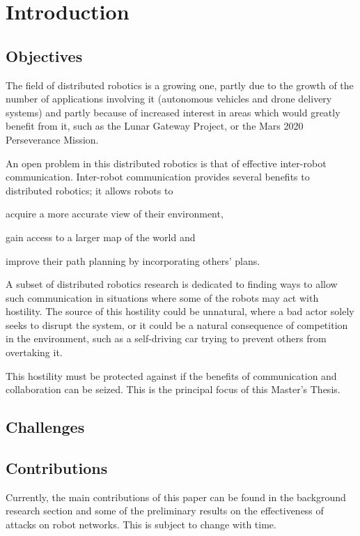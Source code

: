 \chapter{Introduction}
\section{Objectives}

The field of distributed robotics is a growing one, partly due to the growth of the number of applications involving it (autonomous vehicles and drone delivery systems) and partly because of increased interest in areas which would greatly benefit from it, such as the Lunar Gateway Project, or the Mars 2020 Perseverance Mission.

An open problem in this distributed robotics is that of effective inter-robot communication. Inter-robot communication provides several benefits to distributed robotics; it allows robots to
\begin{enumerate*}
    \item acquire a more accurate view of their environment,
    \item gain access to a larger map of the world and
    \item improve their path planning by incorporating others' plans.
\end{enumerate*}

A subset of distributed robotics research is dedicated to finding ways to allow such communication in situations where some of the robots may act with hostility. The source of this hostility could be unnatural, where a bad actor solely seeks to disrupt the system, or it could be a natural consequence of competition in the environment, such as a self-driving car trying to prevent others from overtaking it. 

This hostility must be protected against if the benefits of communication and collaboration can be seized. This is the principal focus of this Master's Thesis.


\section{Challenges}
\section{Contributions}
Currently, the main contributions of this paper can be found in the background research section and some of the preliminary results on the effectiveness of attacks on robot networks. This is subject to change with time.